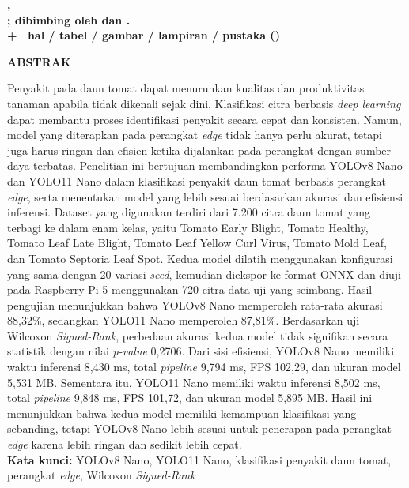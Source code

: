 
\begingroup
\singlespacing

\clearpage
{}
{}
\noindent\textbf{\penulis, \nim}\\
\textbf{\MakeUppercase{\judulid}; dibimbing oleh {\pembimbingutama} dan {\pembimbingpendamping}.}\\
\textbf{\pageref{LastPage} + \getromanpagelast\ hal /  tabel /  gambar /  lampiran /  pustaka (\tahunakademik)}
\begin{center}
    \textbf{ABSTRAK}\\[0.5cm]
\end{center}

Penyakit pada daun tomat dapat menurunkan kualitas dan produktivitas tanaman apabila tidak dikenali sejak dini. Klasifikasi citra berbasis \textit{deep learning} dapat membantu proses identifikasi penyakit secara cepat dan konsisten. Namun, model yang diterapkan pada perangkat \textit{edge} tidak hanya perlu akurat, tetapi juga harus ringan dan efisien ketika dijalankan pada perangkat dengan sumber daya terbatas. Penelitian ini bertujuan membandingkan performa YOLOv8 Nano dan YOLO11 Nano dalam klasifikasi penyakit daun tomat berbasis perangkat \textit{edge}, serta menentukan model yang lebih sesuai berdasarkan akurasi dan efisiensi inferensi. Dataset yang digunakan terdiri dari 7.200 citra daun tomat yang terbagi ke dalam enam kelas, yaitu Tomato Early Blight, Tomato Healthy, Tomato Leaf Late Blight, Tomato Leaf Yellow Curl Virus, Tomato Mold Leaf, dan Tomato Septoria Leaf Spot. Kedua model dilatih menggunakan konfigurasi yang sama dengan 20 variasi \textit{seed}, kemudian diekspor ke format ONNX dan diuji pada Raspberry Pi 5 menggunakan 720 citra data uji yang seimbang. Hasil pengujian menunjukkan bahwa YOLOv8 Nano memperoleh rata-rata akurasi 88,32\%, sedangkan YOLO11 Nano memperoleh 87,81\%. Berdasarkan uji Wilcoxon \textit{Signed-Rank}, perbedaan akurasi kedua model tidak signifikan secara statistik dengan nilai \textit{p-value} 0,2706. Dari sisi efisiensi, YOLOv8 Nano memiliki waktu inferensi 8,430 ms, total \textit{pipeline} 9,794 ms, FPS 102,29, dan ukuran model 5,531 MB. Sementara itu, YOLO11 Nano memiliki waktu inferensi 8,502 ms, total \textit{pipeline} 9,848 ms, FPS 101,72, dan ukuran model 5,895 MB. Hasil ini menunjukkan bahwa kedua model memiliki kemampuan klasifikasi yang sebanding, tetapi YOLOv8 Nano lebih sesuai untuk penerapan pada perangkat \textit{edge} karena lebih ringan dan sedikit lebih cepat. \\[1cm]

\noindent\textbf{Kata kunci:} YOLOv8 Nano, YOLO11 Nano, klasifikasi penyakit daun tomat, perangkat \textit{edge}, Wilcoxon \textit{Signed-Rank}

\endgroup